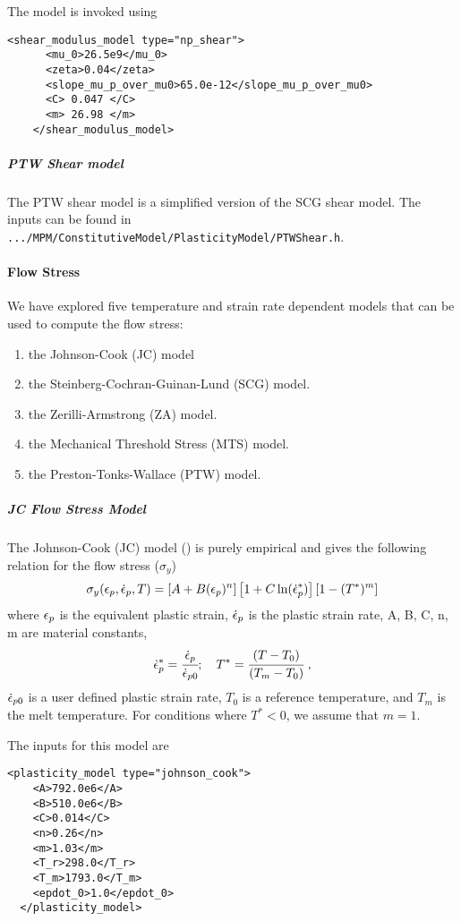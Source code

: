   The model is invoked using
  \begin{Verbatim}[fontsize=\footnotesize]
    <shear_modulus_model type="np_shear">
      <mu_0>26.5e9</mu_0>
      <zeta>0.04</zeta>
      <slope_mu_p_over_mu0>65.0e-12</slope_mu_p_over_mu0>
      <C> 0.047 </C>
      <m> 26.98 </m>
    </shear_modulus_model>
  \end{Verbatim}

  \subparagraph{PTW Shear model}
  The PTW shear model is a simplified version of the SCG shear model.
  The inputs can be found in \verb|.../MPM/ConstitutiveModel/PlasticityModel/PTWShear.h|.

  \paragraph{Flow Stress}
  We have explored five temperature and strain rate dependent
  models that can be used to compute the flow stress:
  \begin{enumerate}
    \item the Johnson-Cook (JC) model
    \item the Steinberg-Cochran-Guinan-Lund (SCG) model.
    \item the Zerilli-Armstrong (ZA) model.
    \item the Mechanical Threshold Stress (MTS) model.
    \item the Preston-Tonks-Wallace (PTW) model.
  \end{enumerate}

  \subparagraph{JC Flow Stress Model}
  The Johnson-Cook (JC) model (\cite{Johnson83}) is purely empirical and gives
  the following relation for the flow stress ($\sigma_y$)
  \begin{equation}
    \sigma_y(\Ep,\Epdot{},T) = 
    \left[A + B (\Ep)^n\right]\left[1 + C \ln(\Epdot{}^{*})\right]
    \left[1 - (T^*)^m\right]
  \end{equation}
  where $\Ep$ is the equivalent plastic strain, $\Epdot{}$ is the
  plastic strain rate, A, B, C, n, m are material constants,
  \begin{equation}
    \Epdot{}^{*} = \cfrac{\Epdot{}}{\Epdot{0}}; \quad
    T^* = \cfrac{(T-T_0)}{(T_m-T_0)}~,
  \end{equation}
  $\Epdot{0}$ is a user defined plastic strain rate,
  $T_0$ is a reference temperature, and $T_m$ is the melt temperature.
  For conditions where $T^* < 0$, we assume that $m = 1$.

  The inputs for this model are
  \begin{Verbatim}[fontsize=\footnotesize]
  <plasticity_model type="johnson_cook">
    <A>792.0e6</A>
    <B>510.0e6</B>
    <C>0.014</C>
    <n>0.26</n>
    <m>1.03</m>
    <T_r>298.0</T_r>
    <T_m>1793.0</T_m>
    <epdot_0>1.0</epdot_0>
  </plasticity_model>
  \end{Verbatim}

